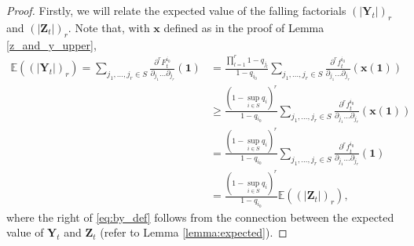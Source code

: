 \documentclass[preprint,3p,12pt]{elsarticle}
\theoremstyle{definition}
\begin{document}
\begin{proof}
Firstly, we will relate the expected value of the falling factorials $(|\boldsymbol{Y}_t|)_{r}$ and $(|\boldsymbol{Z}_t|)_{r}$. Note that, with $\boldsymbol{x}$ defined as in the proof of Lemma \ref{z_and_y_upper},
        \begin{align}
            \mathbb{E}((|\boldsymbol{Y}_t|)_{r})
            = \sum_{j_1, \dots,j_r \in S}\frac{\partial^r F_t^{i_0}}{\partial_{j_1} \dots \partial_{j_r}}(\boldsymbol{1})
             &=  \frac{\prod_{l=1}^r 1-q_{j_l}}{1-q_{i_0}}\sum_{j_1,\dots,j_r \in S}\frac{\partial^r f_t^{i_0}}{\partial_{j_1}\dots \partial_{j_r}}(\boldsymbol{x}(\boldsymbol{1}))\label{eq:by_def} \\
            &\ge \frac{(1-\sup_{i \in S}q_i)^r}{1-q_{i_0}}\sum_{j_1,\dots,j_r \in S} \frac{\partial^r f_t^{i_0}}{\partial_{j_1}\dots \partial_{j_r}}(\boldsymbol{x}(\boldsymbol{1}))\nonumber \\
             &= \frac{(1-\sup_{i \in S}q_i)^r}{1-q_{i_0}}\sum_{j_1,\dots,j_r \in S} \frac{\partial^r f_t^{i_0}}{\partial_{j_1}\dots \partial_{j_r}}(\boldsymbol{1}) \nonumber \\
             &= \frac{(1-\sup_{i \in S}q_i)^r}{1-q_{i_0}} \mathbb{E}((|\boldsymbol{Z}_t|)_{r}),  \label{expectations}
        \end{align}
where the right of \eqref{eq:by_def} follows from the connection between the expected value of $\boldsymbol{Y}_t$ and $\boldsymbol{Z}_t$ (refer to Lemma \ref{lemma:expected}).
        

\end{proof}
\end{document}

